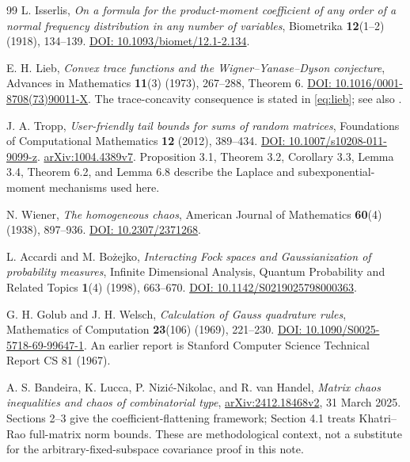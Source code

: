\documentclass[11pt]{article}
\numberwithin{equation}{section}
\theoremstyle{definition}\newtheorem{definition}[theorem]{Definition}
\theoremstyle{remark}\newtheorem{remark}[theorem]{Remark}
\begin{document}
\begin{thebibliography}{99}
L. Isserlis,
\emph{On a formula for the product-moment coefficient of any order of a normal
frequency distribution in any number of variables},
Biometrika \textbf{12}(1--2) (1918), 134--139.
\href{https://doi.org/10.1093/biomet/12.1-2.134}{DOI: 10.1093/biomet/12.1-2.134}.

E. H. Lieb, \emph{Convex trace functions and the Wigner--Yanase--Dyson conjecture},
Advances in Mathematics \textbf{11}(3) (1973), 267--288, Theorem 6.
\href{https://doi.org/10.1016/0001-8708(73)90011-X}{DOI: 10.1016/0001-8708(73)90011-X}.
The trace-concavity consequence is stated in \eqref{eq:lieb}; see also
\cite[Theorem~3.2]{Tropp}.

J. A. Tropp, \emph{User-friendly tail bounds for sums of random matrices},
Foundations of Computational Mathematics \textbf{12} (2012), 389--434.
\href{https://doi.org/10.1007/s10208-011-9099-z}{DOI: 10.1007/s10208-011-9099-z}.
\href{https://arxiv.org/abs/1004.4389v7}{arXiv:1004.4389v7}.
Proposition 3.1, Theorem 3.2, Corollary 3.3, Lemma 3.4, Theorem 6.2,
and Lemma 6.8 describe the Laplace and subexponential-moment mechanisms used here.

N. Wiener, \emph{The homogeneous chaos},
American Journal of Mathematics \textbf{60}(4) (1938), 897--936.
\href{https://doi.org/10.2307/2371268}{DOI: 10.2307/2371268}.

L. Accardi and M. Bo\.{z}ejko,
\emph{Interacting Fock spaces and Gaussianization of probability measures},
Infinite Dimensional Analysis, Quantum Probability and Related Topics
\textbf{1}(4) (1998), 663--670.
\href{https://doi.org/10.1142/S0219025798000363}{DOI: 10.1142/S0219025798000363}.

G. H. Golub and J. H. Welsch,
\emph{Calculation of Gauss quadrature rules},
Mathematics of Computation \textbf{23}(106) (1969), 221--230.
\href{https://doi.org/10.1090/S0025-5718-69-99647-1}{DOI: 10.1090/S0025-5718-69-99647-1}.
An earlier report is Stanford Computer Science Technical Report CS 81 (1967).

A. S. Bandeira, K. Lucca, P. Nizi\'c-Nikolac, and R. van Handel,
\emph{Matrix chaos inequalities and chaos of combinatorial type},
\href{https://arxiv.org/abs/2412.18468v2}{arXiv:2412.18468v2}, 31 March 2025.
Sections 2--3 give the coefficient-flattening framework; Section 4.1 treats
Khatri--Rao full-matrix norm bounds. These are methodological context, not a
substitute for the arbitrary-fixed-subspace covariance proof in this note.
\end{thebibliography}
\end{document}
